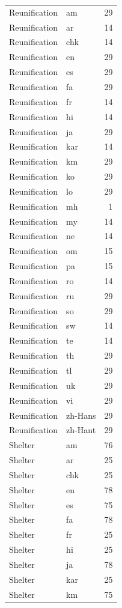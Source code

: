 \begin{longtable}{p{3cm} p{3cm} r}
Reunification & am & 29 \\
Reunification & ar & 14 \\
Reunification & chk & 14 \\
Reunification & en & 29 \\
Reunification & es & 29 \\
Reunification & fa & 29 \\
Reunification & fr & 14 \\
Reunification & hi & 14 \\
Reunification & ja & 29 \\
Reunification & kar & 14 \\
Reunification & km & 29 \\
Reunification & ko & 29 \\
Reunification & lo & 29 \\
Reunification & mh & 1 \\
Reunification & my & 14 \\
Reunification & ne & 14 \\
Reunification & om & 15 \\
Reunification & pa & 15 \\
Reunification & ro & 14 \\
Reunification & ru & 29 \\
Reunification & so & 29 \\
Reunification & sw & 14 \\
Reunification & te & 14 \\
Reunification & th & 29 \\
Reunification & tl & 29 \\
Reunification & uk & 29 \\
Reunification & vi & 29 \\
Reunification & zh-Hans & 29 \\
Reunification & zh-Hant & 29 \\
Shelter & am & 76 \\
Shelter & ar & 25 \\
Shelter & chk & 25 \\
Shelter & en & 78 \\
Shelter & es & 75 \\
Shelter & fa & 78 \\
Shelter & fr & 25 \\
Shelter & hi & 25 \\
Shelter & ja & 78 \\
Shelter & kar & 25 \\
Shelter & km & 75 \\

\end{longtable}
